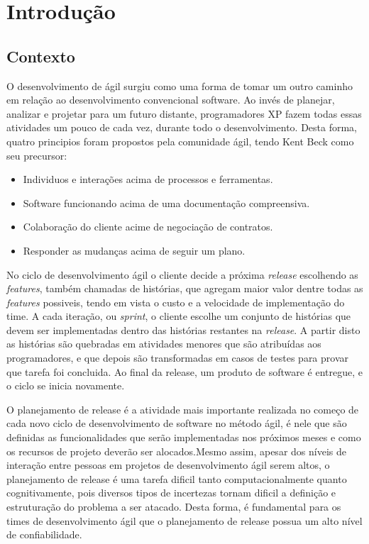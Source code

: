 \chapter{Introdução}
\section{Contexto}
O desenvolvimento de ágil surgiu como uma forma de tomar um outro
caminho em relação ao desenvolvimento convencional software. Ao invés de planejar,
analizar e projetar para um futuro distante, programadores XP fazem todas essas
atividades um pouco de cada vez, durante todo o desenvolvimento\cite{XP}.
Desta forma, quatro principios foram propostos pela comunidade ágil, tendo Kent
Beck como seu precursor\cite{beckManifesto}:
\begin{itemize}
    \item Individuos e interações acima de processos e ferramentas.
    \item Software funcionando acima de uma documentação compreensiva.
    \item Colaboração do cliente acime de negociação de contratos.
    \item Responder as mudanças acima de seguir um plano.
\end{itemize}

No ciclo de desenvolvimento ágil o cliente decide a próxima \textit{release}
escolhendo as \textit{features}, também chamadas de histórias, que agregam
maior valor dentre todas as \textit{features} possiveis, tendo em vista  o custo
e a velocidade de implementação do time. A cada iteração, ou \textit{sprint}, o
cliente escolhe um conjunto de  histórias que devem ser implementadas dentro das 
histórias restantes na \textit{release}. A partir disto as histórias são quebradas em
atividades menores que são atribuídas aos programadores, e que depois são 
transformadas em casos de testes para provar que tarefa foi concluida\cite{XP}.
Ao final da release, um produto de software é entregue, e o ciclo se inicia 
novamente.

O planejamento de release é a atividade mais importante realizada no começo de 
cada novo ciclo de desenvolvimento de software no método ágil, é nele que são 
definidas as funcionalidades que serão implementadas nos próximos meses e como 
os recursos de projeto deverão ser alocados.Mesmo assim, apesar dos níveis de 
interação entre pessoas em projetos de desenvolvimento ágil serem altos, 
o planejamento de  release é uma tarefa dificil tanto computacionalmente quanto 
cognitivamente, pois diversos tipos de incertezas tornam dificil a definição e 
estruturação do problema a ser atacado\cite{Ngo}. Desta forma, é fundamental para 
os times de desenvolvimento ágil que o planejamento de release possua um alto 
nível de confiabilidade\cite{McDaid}.

